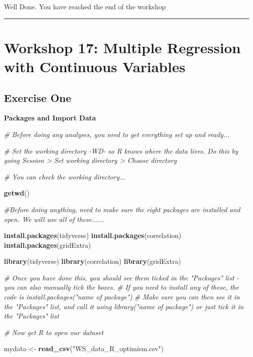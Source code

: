 \documentclass[
]{book}
\newenvironment{Shaded}{\begin{snugshade}}{\end{snugshade}}
\newcommand{\CommentTok}[1]{\textcolor[rgb]{0.56,0.35,0.01}{\textit{#1}}}
\newcommand{\FunctionTok}[1]{\textcolor[rgb]{0.13,0.29,0.53}{\textbf{#1}}}
\newcommand{\NormalTok}[1]{#1}
\newcommand{\OtherTok}[1]{\textcolor[rgb]{0.56,0.35,0.01}{#1}}
\newcommand{\StringTok}[1]{\textcolor[rgb]{0.31,0.60,0.02}{#1}}
\let\oldsection\section
\renewcommand{\section}{\needspace{5\baselineskip}\oldsection}
\begin{document}
Well Done.
You have reached the end of the workshop

\begin{center}\rule{0.5\linewidth}{0.5pt}\end{center}

\chapter{Workshop 17: Multiple Regression with Continuous Variables}\label{workshop-17-multiple-regression-with-continuous-variables}

\section{Exercise One}\label{exercise-one-1}

\textbf{Packages and Import Data}

\begin{Shaded}
\begin{Highlighting}[]
\CommentTok{\# Before doing any analyses, you need to get everything set up and ready...}

\CommentTok{\# Set the working directory {-}WD{-} so R knows where the data lives. Do this by going Session \textgreater{} Set working directory \textgreater{} Choose directory}

\CommentTok{\# You can check the working directory...}

\FunctionTok{getwd}\NormalTok{()}

\CommentTok{\#Before doing anything, need to make sure the right packages are installed and open. We will use all of these......}

\FunctionTok{install.packages}\NormalTok{(tidyverse)}
\FunctionTok{install.packages}\NormalTok{(correlation)}
\FunctionTok{install.packages}\NormalTok{(gridExtra)}

\FunctionTok{library}\NormalTok{(tidyverse)}
\FunctionTok{library}\NormalTok{(correlation)}
\FunctionTok{library}\NormalTok{(gridExtra)}

\CommentTok{\# Once you have done this, you should see them ticked in the "Packages" list {-} you can also manually tick the boxes.}
\CommentTok{\# If you need to install any of these, the code is install.packages("name of package")}
\CommentTok{\# Make sure you can then see it in the "Packages" list, and call it using library("name of package") or just tick it in the "Packages" list}

\CommentTok{\# Now get R to open our dataset}

\NormalTok{mydata }\OtherTok{\textless{}{-}} \FunctionTok{read\_csv}\NormalTok{(}\StringTok{"WS\_data\_R\_optimism.csv"}\NormalTok{)}
\end{Highlighting}
\end{Shaded}
\end{document}
